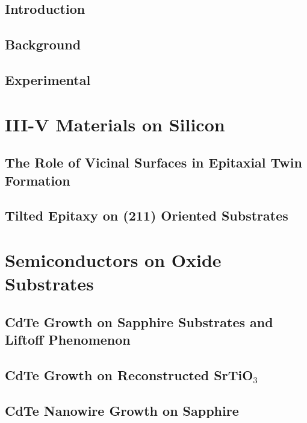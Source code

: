 \documentclass[letterpaper,12pt,twoside,openright]{report}
\begin{document}

\chapter{Introduction}


\chapter{Background}


\chapter{Experimental}


\part{III-V Materials on Silicon}
\chapter{The Role of Vicinal Surfaces in Epitaxial Twin Formation}


\chapter{Tilted Epitaxy on (211) Oriented Substrates}


\part{Semiconductors on Oxide Substrates}
\chapter{CdTe Growth on Sapphire Substrates and Liftoff Phenomenon}


\chapter{CdTe Growth on Reconstructed \texorpdfstring{SrTiO\(_3\)}{SrTiO3}}


\chapter{CdTe Nanowire Growth on Sapphire}

\end{document}
